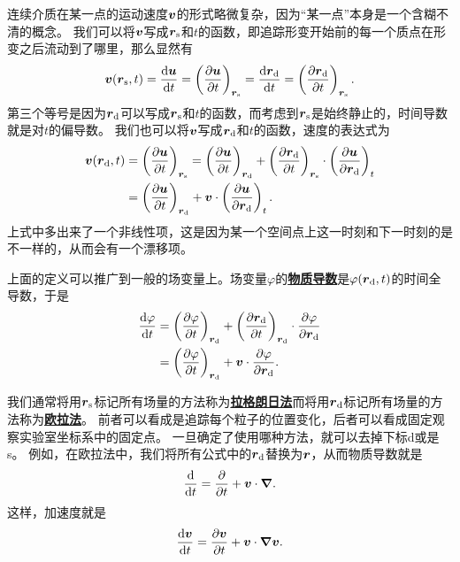 \documentclass[hyperref, UTF8, a4paper]{ctexart}
\newcommand{\concept}[1]{\underline{\textbf{#1}}}
\begin{document}
连续介质在某一点的运动速度$\vb*{v}$的形式略微复杂，因为“某一点”本身是一个含糊不清的概念。
我们可以将$\vb*{v}$写成$\vb*{r}_\text{s}$和$t$的函数，即追踪形变开始前的每一个质点在形变之后流动到了哪里，那么显然有
\begin{equation}
    \vb*{v}(\vb*{r}_\text{s}, t) = \dv{\vb*{u}}{t} = \left( \pdv{\vb*{u}}{t} \right)_{\vb*{r}_\text{s}} = \dv{\vb*{r}_\text{d}}{t} = \left( \pdv{\vb*{r}_\text{d}}{t} \right)_{\vb*{r}_\text{s}}.
\end{equation}
第三个等号是因为$\vb*{r}_\text{d}$可以写成$\vb*{r}_\text{s}$和$t$的函数，而考虑到$\vb*{r}_\text{s}$是始终静止的，时间导数就是对$t$的偏导数。
我们也可以将$\vb*{v}$写成$\vb*{r}_\text{d}$和$t$的函数，速度的表达式为
\begin{equation}
    \begin{aligned}
        \vb*{v}(\vb*{r}_\text{d}, t) &= \left( \pdv{\vb*{u}}{t} \right)_{\vb*{r}_\text{s}} = \left( \pdv{\vb*{u}}{t} \right)_{\vb*{r}_\text{d}} + \left( \pdv{\vb*{r}_\text{d}}{t} \right)_{\vb*{r}_\text{s}} \cdot \left( \pdv{\vb*{u}}{\vb*{r}_\text{d}} \right)_t \\
        &= \left( \pdv{\vb*{u}}{t} \right)_{\vb*{r}_\text{d}} + \vb*{v} \cdot \left(\pdv{\vb*{u}}{\vb*{r}_\text{d}}\right)_t.
    \end{aligned}
\end{equation}
上式中多出来了一个非线性项，这是因为某一个空间点上这一时刻和下一时刻的是不一样的，从而会有一个漂移项。

上面的定义可以推广到一般的场变量上。场变量$\varphi$的\concept{物质导数}是$\varphi(\vb*{r}_\text{d}, t)$的时间全导数，于是
\begin{equation}
    \begin{aligned}
        \dv{\varphi}{t} &= \left( \pdv{\varphi}{t} \right)_{\vb*{r}_\text{d}} + \left( \pdv{\vb*{r}_\text{d}}{t} \right)_{\vb*{r}_\text{d}} \cdot \pdv{\varphi}{\vb*{r}_\text{d}} \\
        &= \left( \pdv{\varphi}{t} \right)_{\vb*{r}_\text{d}} + \vb*{v} \cdot \pdv{\varphi}{\vb*{r}_\text{d}}.
    \end{aligned}
\end{equation}

我们通常将用$\vb*{r}_\text{s}$标记所有场量的方法称为\concept{拉格朗日法}而将用$\vb*{r}_\text{d}$标记所有场量的方法称为\concept{欧拉法}。
前者可以看成是追踪每个粒子的位置变化，后者可以看成固定观察实验室坐标系中的固定点。
一旦确定了使用哪种方法，就可以去掉下标d或是s。
例如，在欧拉法中，我们将所有公式中的$\vb*{r}_\text{d}$替换为$\vb*{r}$，从而物质导数就是
\begin{equation}
    \dv{t} = \pdv{t} + \vb*{v} \cdot \grad.
\end{equation}
这样，加速度就是
\begin{equation}
    \dv{\vb*{v}}{t} = \pdv{\vb*{v}}{t} + \vb*{v} \cdot \grad{\vb*{v}}.
\end{equation}
\end{document}
